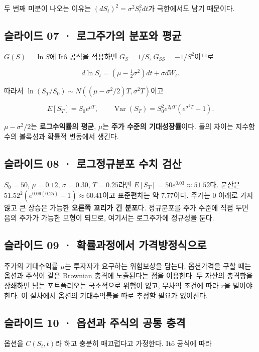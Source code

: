 \documentclass[11pt,a4paper]{article}
\begin{document}
두 번째 미분이 나오는 이유는 $(dS_t)^2=\sigma^2S_t^2dt$가 극한에서도 남기 때문이다.\par

\subsection{슬라이드 07 · 로그주가의 분포와 평균}
$G(S)=\ln S$에 Itô 공식을 적용하면 $G_S=1/S$, $G_{SS}=-1/S^2$이므로\par

\[
d\ln S_t=(\mu-\tfrac12\sigma^2)dt+\sigma dW_t.
\]

따라서 $\ln(S_T/S_0)\sim N((\mu-\sigma^2/2)T,\sigma^2T)$이고\par

\[
E[S_T]=S_0e^{\mu T},\qquad
\operatorname{Var}(S_T)=S_0^2e^{2\mu T}(e^{\sigma^2T}-1).
\]

$\mu-\sigma^2/2$는 \textbf{로그수익률의 평균}, $\mu$는 \textbf{주가 수준의 기대성장률}이다. 둘의 차이는 지수함수의 볼록성과 확률적 변동에서 생긴다.\par

\subsection{슬라이드 08 · 로그정규분포 수치 검산}
$S_0=50$, $\mu=0.12$, $\sigma=0.30$, $T=0.25$라면 $E[S_T]=50e^{0.03}\approx51.52$다. 분산은 $51.52^2(e^{0.09(0.25)}-1)\approx60.41$이고 표준편차는 약 7.77이다. 주가는 0 아래로 가지 않고 큰 상승은 가능한 \textbf{오른쪽 꼬리가 긴 분포}다. 정규분포를 주가 수준에 직접 두면 음의 주가가 가능한 모형이 되므로, 여기서는 로그주가에 정규성을 둔다.\par

\subsection{슬라이드 09 · 확률과정에서 가격방정식으로}
주가의 기대수익률 $\mu$는 투자자가 요구하는 위험보상을 담는다. 옵션가격을 구할 때는 옵션과 주식이 같은 Brownian 충격에 노출된다는 점을 이용한다. 두 자산의 충격항을 상쇄하면 남는 포트폴리오는 국소적으로 위험이 없고, 무차익 조건에 따라 $r$을 벌어야 한다. 이 절차에서 옵션의 기대수익률을 따로 추정할 필요가 없어진다.\par

\subsection{슬라이드 10 · 옵션과 주식의 공통 충격}
옵션을 $C(S_t,t)$라 하고 충분히 매끄럽다고 가정한다. Itô 공식에 따라\par
\end{document}
